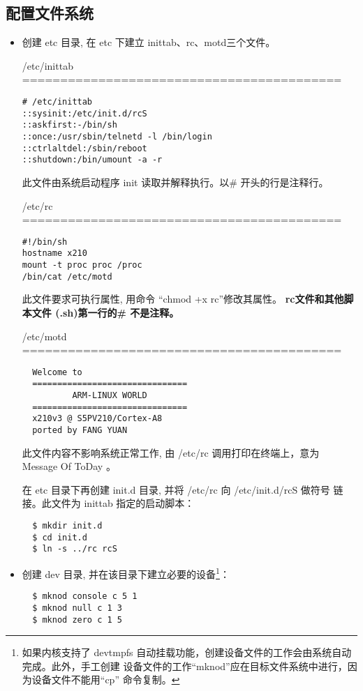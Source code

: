 \subsection{配置文件系统}
\begin{itemize}
  \item 创建 etc 目录, 在 etc 下建立 inittab、rc、motd三个文件。

    /etc/inittab \\ ==========================================

\begin{verbatim}
# /etc/inittab
::sysinit:/etc/init.d/rcS
::askfirst:-/bin/sh
::once:/usr/sbin/telnetd -l /bin/login
::ctrlaltdel:/sbin/reboot
::shutdown:/bin/umount -a -r
\end{verbatim}

    此文件由系统启动程序 init 读取并解释执行。以\# 开头的行是注释行。

    /etc/rc \\ ==========================================

\begin{verbatim}
#!/bin/sh
hostname x210
mount -t proc proc /proc
/bin/cat /etc/motd
\end{verbatim}

此文件要求可执行属性, 用命令 ``chmod +x rc''修改其属性。
{\bf rc文件和其他脚本文件 (.sh)第一行的\# 不是注释。}

    /etc/motd \\ ==========================================

\begin{verbatim}
  Welcome to
  ===============================
          ARM-LINUX WORLD
  ===============================
  x210v3 @ S5PV210/Cortex-A8
  ported by FANG YUAN
\end{verbatim}

此文件内容不影响系统正常工作, 由 /etc/rc 调用打印在终端上，意为 Message
Of ToDay 。

在 etc 目录下再创建 init.d 目录, 并将 /etc/rc 向 /etc/init.d/rcS 做符号
链接。此文件为 inittab 指定的启动脚本：
\begin{verbatim}
  $ mkdir init.d
  $ cd init.d
  $ ln -s ../rc rcS
\end{verbatim}

  \item 创建 dev 目录, 并在该目录下建立必要的设备\footnote{如果内核支持了
devtmpfs 自动挂载功能，创建设备文件的工作会由系统自动完成。此外，手工创建
  设备文件的工作``mknod''应在目标文件系统中进行，因为设备文件不能用``cp''
  命令复制。}：
\begin{verbatim}
  $ mknod console c 5 1
  $ mknod null c 1 3
  $ mknod zero c 1 5
\end{verbatim}


\end{itemize}
